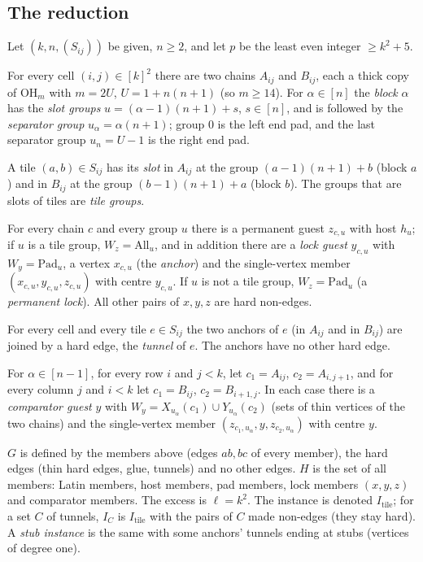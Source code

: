\subsection{The reduction}\label{sec:hred}
Let $(k,n,(S_{ij}))$ be given, $n\ge2$, and let $p$ be the least even integer $\ge k^2+5$.

 For every cell $(i,j)\in[k]^2$ there are two chains $A_{ij}$ and $B_{ij}$, each a thick copy of $\mathrm{OH}_m$ with $m=2U$, $U=1+n(n+1)$ (so $m\ge14$). For $\alpha\in[n]$ the \emph{block} $\alpha$ has the \emph{slot groups} $u=(\alpha-1)(n+1)+s$, $s\in[n]$, and is followed by the \emph{separator group} $u_\alpha=\alpha(n+1)$; group $0$ is the left end pad, and the last separator group $u_n=U-1$ is the right end pad.

 A tile $(a,b)\in S_{ij}$ has its \emph{slot} in $A_{ij}$ at the group $(a-1)(n+1)+b$ (block $a$) and in $B_{ij}$ at the group $(b-1)(n+1)+a$ (block $b$). The groups that are slots of tiles are \emph{tile groups}.

 For every chain $c$ and every group $u$ there is a permanent guest $z_{c,u}$ with host $h_u$; if $u$ is a tile group, $W_z=\mathrm{All}_u$, and in addition there are a \emph{lock guest} $y_{c,u}$ with $W_y=\mathrm{Pad}_u$, a vertex $x_{c,u}$ (the \emph{anchor}) and the single-vertex member $(x_{c,u},y_{c,u},z_{c,u})$ with centre $y_{c,u}$. If $u$ is not a tile group, $W_z=\mathrm{Pad}_u$ (a \emph{permanent lock}). All other pairs of $x,y,z$ are hard non-edges.

 For every cell and every tile $e\in S_{ij}$ the two anchors of $e$ (in $A_{ij}$ and in $B_{ij}$) are joined by a hard edge, the \emph{tunnel} of $e$. The anchors have no other hard edge.

 For $\alpha\in[n-1]$, for every row $i$ and $j<k$, let $c_1=A_{ij}$, $c_2=A_{i,j+1}$, and for every column $j$ and $i<k$ let $c_1=B_{ij}$, $c_2=B_{i+1,j}$. In each case there is a \emph{comparator guest} $y$ with $W_y=X_{u_\alpha}(c_1)\cup Y_{u_\alpha}(c_2)$ (sets of thin vertices of the two chains) and the single-vertex member $(z_{c_1,u_\alpha},y,z_{c_2,u_\alpha})$ with centre $y$.

 $G$ is defined by the members above (edges $ab,bc$ of every member), the hard edges (thin hard edges, glue, tunnels) and no other edges. $H$ is the set of all members: Latin members, host members, pad members, lock members $(x,y,z)$ and comparator members. The excess is $\ell=k^2$. The instance is denoted $I_{\mathrm{tile}}$; for a set $C$ of tunnels, $I_C$ is $I_{\mathrm{tile}}$ with the pairs of $C$ made non-edges (they stay hard). A \emph{stub instance} is the same with some anchors' tunnels ending at stubs (vertices of degree one).


